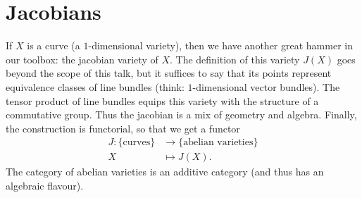 \documentclass[a4paper,10pt]{article}
\begin{document}
\section{Jacobians}

If $X$ is a curve (a $1$-dimensional variety), then we have another great
hammer in our toolbox: the jacobian variety of $X$. The definition of this
variety $J(X)$ goes beyond the scope of this talk, but it suffices to say that
its points represent equivalence classes of line bundles (think:
$1$-dimensional vector bundles). The tensor product of line bundles equips this
variety with the structure of a commutative group. Thus the jacobian is a mix
of geometry and algebra. Finally, the construction is functorial, so that we
get a functor
\begin{align*} %
	J \colon \{\text{curves}\} &\to \{\text{abelian varieties}\} \\
	X &\mapsto J(X).
\end{align*} %
The category of abelian varieties is an additive category (and thus has an
algebraic flavour).



\end{document}
